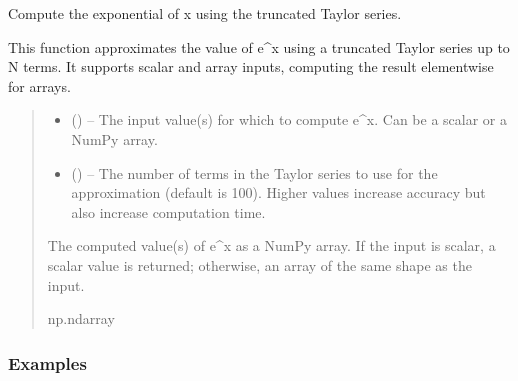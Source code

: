 \documentclass[a4paper,10pt,oneside,english]{sphinxmanual}
\begin{document}
\begin{fulllineitems}
\label{\detokenize{acsefunctions:acsefunctions.functions.exp}}
\pysigstartsignatures
\pysiglinewithargsret
{}
{\sphinxparamcomma {}}
{}
\pysigstopsignatures
\sphinxAtStartPar
Compute the exponential of x using the truncated Taylor series.

\sphinxAtStartPar
This function approximates the value of e\textasciicircum{}x using a truncated Taylor series
up to N terms. It supports scalar and array inputs, computing the result
element\sphinxhyphen{}wise for arrays.
\begin{quote}\begin{description}
\begin{itemize}
\item {} 
\sphinxAtStartPar
{} () – The input value(s) for which to compute e\textasciicircum{}x.
Can be a scalar or a NumPy array.

\item {} 
\sphinxAtStartPar
{} (\sphinxstyleliteralemphasis{\sphinxupquote{, }}) – The number of terms in the Taylor series to use for the approximation
(default is 100).
Higher values increase accuracy but also increase computation time.

\end{itemize}

\sphinxAtStartPar
The computed value(s) of e\textasciicircum{}x as a NumPy array.
If the input is scalar, a scalar value is returned;
otherwise, an array of the same shape as the input.

\sphinxAtStartPar
np.ndarray

\end{description}\end{quote}
\subsubsection*{Examples}


\end{fulllineitems}
\end{document}
